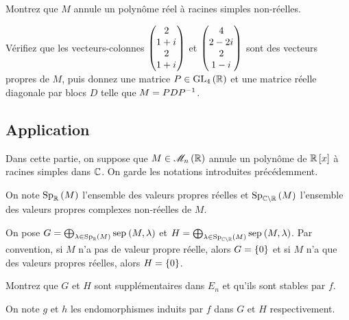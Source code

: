 \begin{corr}
\end{corr}

\begin{q}
Montrez que \(M\) annule un polynôme réel à racines simples non-réelles.

Vérifiez que les vecteurs-colonnes \(\begin{pmatrix}2 \\ 1+i\mkern1mu \\ 2 \\ 1+i\mkern1mu\end{pmatrix}\) et \(\begin{pmatrix}4 \\ 2-2i\mkern1mu \\ 2 \\ 1-i\mkern1mu\end{pmatrix}\) sont des vecteurs propres de \(M\), puis donnez une matrice \(P\in\GL{4}[\R]\) et une matrice réelle diagonale par blocs \(D\) telle que \(M=PDP^{-1}\).
\end{q}

\begin{corr}
\end{corr}

\subsection*{Application}

Dans cette partie, on suppose que \(M\in\M{n}[\R]\) annule un polynôme de \(\poly[\R][x]\) à racines simples dans \(\mathbb{C}\). On garde les notations introduites précédemment.

On note \(\Sp[\R]{M}\) l'ensemble des valeurs propres réelles et \(\Sp[\C\excluant\R]{M}\) l'ensemble des valeurs propres complexes non-réelles de \(M\).

\begin{q}
On pose \(G=\bigoplus_{\lambda\in\Sp[\R]{M}}\sep{M}{\lambda}\) et \(H=\bigoplus_{\lambda\in\Sp[\C\excluant\R]{M}}\sep{M}{\lambda}\). Par convention, si \(M\) n'a pas de valeur propre réelle, alors \(G=\left\lbrace0\right\rbrace\) et si \(M\) n'a que des valeurs propres réelles, alors \(H=\left\lbrace0\right\rbrace\).

Montrez que \(G\) et \(H\) sont supplémentaires dans \(E_n\) et qu'ils sont stables par \(f\).

On note \(g\) et \(h\) les endomorphismes induits par \(f\) dans \(G\) et \(H\) respectivement.
\end{q}

